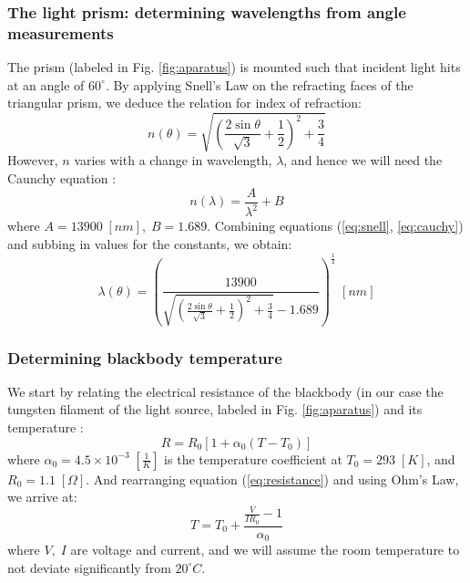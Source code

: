 \documentclass[12pt]{article}
\begin{document}
\subsubsection{The light prism: determining wavelengths from angle measurements} \label{sec:prism}
The prism (labeled in Fig. \ref{fig:aparatus}) is mounted such that incident light hits at an angle of $60^\circ$. By applying Snell's Law on the refracting faces of the triangular prism, we deduce the relation for index of refraction:
\begin{equation}
    n(\theta)=\sqrt{\left(\frac{2\sin\theta}{\sqrt{3}}+\frac{1}{2}\right)^2+\frac{3}{4}}
    \label{eq:snell}
\end{equation}
However, $n$ varies with a change in wavelength, $\lambda$, and hence we will need the Caunchy equation \autocite{manuall}:
\begin{equation}
    n(\lambda)=\frac{A}{\lambda^2}+B
    \label{eq:cauchy}
\end{equation}
where $A=13900\;[nm],\;B=1.689$. Combining equations (\ref{eq:snell}, \ref{eq:cauchy}) and subbing in values for the constants, we obtain:
\begin{equation}
    \lambda(\theta)=\left({\frac{13900}{\sqrt{\left(\frac{2\sin\theta}{\sqrt{3}}+\frac{1}{2}\right)^2+\frac{3}{4}}-1.689}}\right)^\frac{1}{2}\;[nm]
    \label{eq:lambda(theta)}
\end{equation}

\subsubsection{Determining blackbody temperature} \label{sec:temp}
We start by relating the electrical resistance of the blackbody (in our case the tungsten filament of the light source, labeled in Fig. \ref{fig:aparatus}) and its temperature \autocite{manuall}:
\begin{equation}
    R=R_0\left[1+\alpha_0(T-T_0)\right]
    \label{eq:resistance}
\end{equation}
where $\alpha_0=4.5\times10^{-3}\;\left[\frac{1}{K}\right]$ is the temperature coefficient at $T_0=293\;[K]$, and $R_0=1.1\;[\Omega]$. And rearranging equation (\ref{eq:resistance}) and using Ohm's Law, we arrive at:
\begin{equation}
    T=T_0+\frac{\frac{V}{IR_0}-1}{\alpha_0}
    \label{eq:temperature}
\end{equation}
where $V,\;I$ are voltage and current, and we will assume the room temperature to not deviate significantly from $20^\circ C$.
\end{document}
